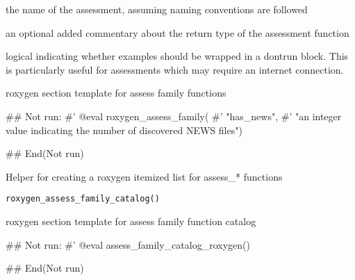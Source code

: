 \documentclass[a4paper]{book}
\begin{document}
%
\begin{Arguments}
\begin{ldescription}
\item[\code{name}] the name of the assessment, assuming naming conventions are
followed

\item[\code{return\_type}] an optional added commentary about the return type of the
assessment function

\item[\code{dontrun}] logical indicating whether examples should be wrapped in
a dontrun block. This is particularly useful for assessments which may
require an internet connection.
\end{ldescription}
\end{Arguments}
%
\begin{Value}
roxygen section template for assess family functions
\end{Value}
%
\begin{Examples}
\begin{ExampleCode}
## Not run: 
#' @eval roxygen_assess_family(
#'   "has_news",
#'   "an integer value indicating the number of discovered NEWS files")

## End(Not run)

\end{ExampleCode}
\end{Examples}
%
\begin{Description}
Helper for creating a roxygen itemized list for assess\_* functions
\end{Description}
%
\begin{Usage}
\begin{verbatim}
roxygen_assess_family_catalog()
\end{verbatim}
\end{Usage}
%
\begin{Value}
roxygen section template for assess family function catalog
\end{Value}
%
\begin{Examples}
\begin{ExampleCode}
## Not run: 
  #' @eval assess_family_catalog_roxygen()

## End(Not run)
\end{ExampleCode}
\end{Examples}
\end{document}
